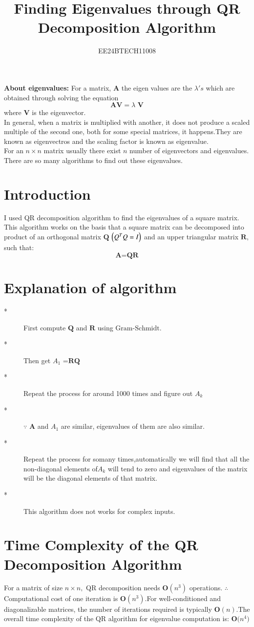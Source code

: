 \documentclass[journal,20pt,onecolumn]{IEEEtran}
\title{Finding Eigenvalues through QR Decomposition Algorithm}
\author{EE24BTECH11008}
\date{}
\theoremstyle{remark}
\begin{document}
\maketitle
\textbf{About eigenvalues:} For a matrix, $\textbf{A}$ the eigen values are the $\lambda\prime s$ which are obtained through solving the equation $$\textbf{AV$=\lambda$ V}$$ where $\textbf{V}$ is the eigenvector.\\
In general, when a matrix is multiplied with another, it does not produce a scaled multiple of the second one, both for some special matrices, it happens.They are known as eigenvectros and the scaling factor is known as eigenvalue.\\
For an $n \times n$ matrix usually there exist $n$ number of eigenvectors and eigenvalues.\\
There are so many algorithms to find out these eigenvalues.
\section{Introduction}
I used QR decomposition algorithm to find the eigenvalues of a square matrix. This algorithm works on the basis that a square matrix can be decomposed into product of an orthogonal matrix $\textbf{Q}$ $\left(\textbf{$Q^TQ=I$}\right)$ and an upper triangular matrix $\textbf{R}$, such that:
$$\textbf{A=QR}$$
\section{Explanation of algorithm}
\begin{description}
    \item[*] First compute $\textbf{Q}$ and $\textbf{R}$ using $\text{Gram-Schmidt.}$
    \item[*] Then get $\textbf{$A_1$ =RQ}$
    \item[*] Repeat the process for around 1000 times and figure out $\textbf{$A_k$}$ 
    \item[*] $\because$ $\textbf{A}$ and $\textbf{$A_1$}$ are similar, eigenvalues of them are also similar.
    \item[*] Repeat the process for somany times,automatically we will find that all the non-diagonal elements of$\textbf{$A_k$}$ will tend to zero and eigenvalues of the matrix will be the diagonal elements of that matrix.
    \item[*] This algorithm does not works for complex inputs. 
\end{description}

\section{Time Complexity of the QR Decomposition Algorithm}
 For a matrix of size $ n \times n ,$ QR decomposition needs $\textbf{O}(n^3)$ operations. $\therefore$ Computational cost of one iteration is $\textbf{O}(n^3)$.For well-conditioned and diagonalizable matrices, the number of iterations required is typically $\textbf{O}(n)$.The overall time complexity of the QR algorithm for eigenvalue computation is: $\textbf{O($n^4$)}$
\end{document}
